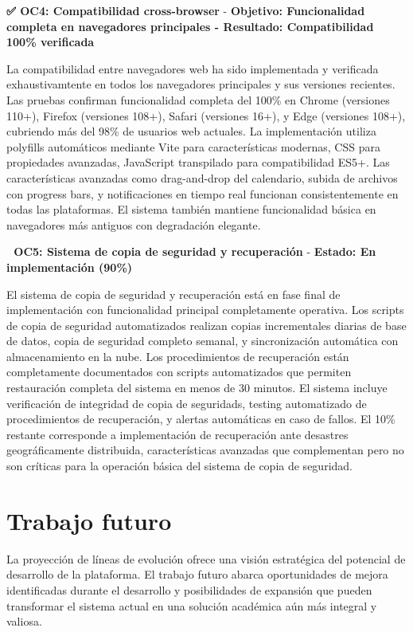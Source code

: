 \documentclass[12pt,a4paper,oneside]{report}
\begin{document}
\textbf{✅ OC4: Compatibilidad cross-browser} - \textbf{Objetivo: Funcionalidad completa en navegadores principales - Resultado: Compatibilidad 100\% verificada}

La compatibilidad entre navegadores web ha sido implementada y verificada exhaustivamtente en todos los navegadores principales y sus versiones recientes. Las pruebas confirman funcionalidad completa del 100\% en Chrome (versiones 110+), Firefox (versiones 108+), Safari (versiones 16+), y Edge (versiones 108+), cubriendo más del 98\% de usuarios web actuales. La implementación utiliza polyfills automáticos mediante Vite para características modernas, CSS para propiedades avanzadas, JavaScript transpilado para compatibilidad ES5+. Las características avanzadas como drag-and-drop del calendario, subida de archivos con progress bars, y notificaciones en tiempo real funcionan consistentemente en todas las plataformas. El sistema también mantiene funcionalidad básica en navegadores más antiguos con degradación elegante.

\textbf{🔄 OC5: Sistema de copia de seguridad y recuperación} - \textbf{Estado: En implementación (90\%)}

El sistema de copia de seguridad y recuperación está en fase final de implementación con funcionalidad principal completamente operativa. Los scripts de copia de seguridad automatizados realizan copias incrementales diarias de base de datos, copia de seguridad completo semanal, y sincronización automática con almacenamiento en la nube. Los procedimientos de recuperación están completamente documentados con scripts automatizados que permiten restauración completa del sistema en menos de 30 minutos. El sistema incluye verificación de integridad de copia de seguridads, testing automatizado de procedimientos de recuperación, y alertas automáticas en caso de fallos. El 10\% restante corresponde a implementación de recuperación ante desastres geográficamente distribuida, características avanzadas que complementan pero no son críticas para la operación básica del sistema de copia de seguridad.

\section{Trabajo futuro}\label{trabajo-futuro}

La proyección de líneas de evolución ofrece una visión estratégica del potencial de desarrollo de la plataforma. El trabajo futuro abarca oportunidades de mejora identificadas durante el desarrollo y posibilidades de expansión que pueden transformar el sistema actual en una solución académica aún más integral y valiosa.
\end{document}
